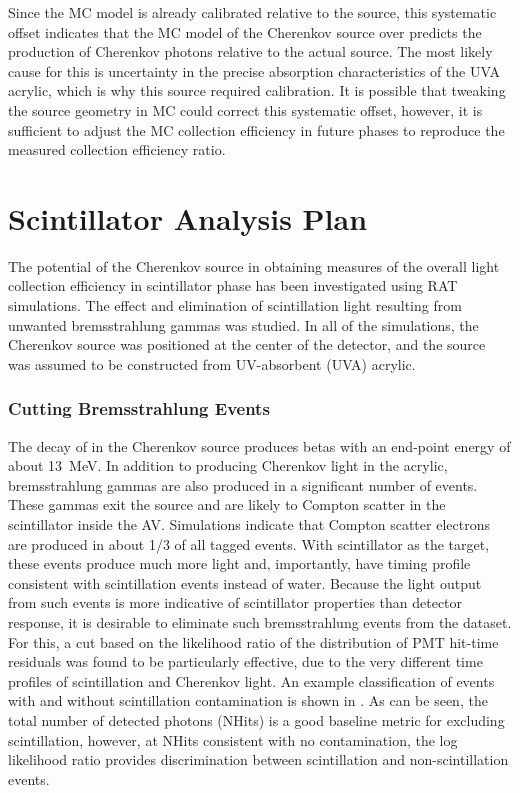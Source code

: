 Since the MC model is already calibrated relative to the \N source, this systematic offset indicates that the MC model of the Cherenkov source over predicts the production of Cherenkov photons relative to the actual source.
The most likely cause for this is uncertainty in the precise absorption characteristics of the UVA acrylic, which is why this source required calibration.
It is possible that tweaking the source geometry in MC could correct this systematic offset, however, it is sufficient to adjust the MC collection efficiency in future phases to reproduce the measured collection efficiency ratio.


\section{Scintillator Analysis Plan}
The potential of the Cherenkov source in obtaining measures of the overall light collection efficiency in scintillator phase has been investigated using RAT simulations. 
The effect and elimination of scintillation light resulting from unwanted bremsstrahlung gammas was studied.  
In all of the simulations, the Cherenkov source was positioned at the center of the detector, and the source was assumed to be constructed from UV-absorbent (UVA) acrylic.
 
\subsubsection{Cutting Bremsstrahlung Events}

The decay of \Li in the Cherenkov source produces betas with an end-point energy of about 13~MeV. 
In addition to producing Cherenkov light in the acrylic, bremsstrahlung gammas are also produced in a significant number of events.  
These gammas exit the source and are likely to Compton scatter in the scintillator inside the AV.  
Simulations indicate that Compton scatter electrons are produced in about 1/3 of all tagged events.  
With scintillator as the target, these events produce much more light and, importantly, have timing profile consistent with scintillation events instead of water.  
Because the light output from such events is more indicative of scintillator properties than detector response, it is desirable to eliminate such bremsstrahlung events from the dataset.
For this, a cut based on the likelihood ratio of the distribution of PMT hit-time residuals was found to be particularly effective, due to the very different time profiles of scintillation and Cherenkov light.
An example classification of events with and without scintillation contamination is shown in .
As can be seen, the total number of detected photons (NHits) is a good baseline metric for excluding scintillation, however, at NHits consistent with no contamination, the log likelihood ratio provides discrimination between scintillation and non-scintillation events. 

